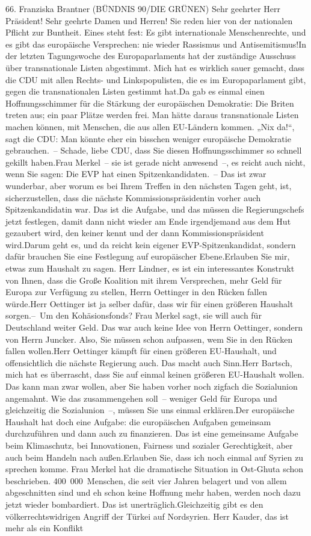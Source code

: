 \documentclass{article}
\begin{document}
	66. Franziska Brantner (BÜNDNIS 90/DIE GRÜNEN) Sehr geehrter Herr Präsident! Sehr geehrte Damen und Herren! Sie reden hier von der nationalen Pflicht zur Buntheit. Eines steht fest: Es gibt internationale Menschenrechte, und es gibt das europäische Versprechen: nie wieder Rassismus und Antisemitismus!In der letzten Tagungswoche des Europaparlaments hat der zuständige Ausschuss über transnationale Listen abgestimmt. Mich hat es wirklich sauer gemacht, dass die CDU mit allen Rechts- und Linkspopulisten, die es im Europaparlament gibt, gegen die transnationalen Listen gestimmt hat.Da gab es einmal einen Hoffnungsschimmer für die Stärkung der europäischen Demokratie: Die Briten treten aus; ein paar Plätze werden frei. Man hätte daraus transnationale Listen machen können, mit Menschen, die aus allen EU-Ländern kommen. „Nix da!“, sagt die CDU: Man könnte eher ein bisschen weniger europäische Demokratie gebrauchen. – Schade, liebe CDU, dass Sie diesen Hoffnungsschimmer so schnell gekillt haben.Frau Merkel – sie ist gerade nicht anwesend –, es reicht auch nicht, wenn Sie sagen: Die EVP hat einen Spitzenkandidaten. – Das ist zwar wunderbar, aber worum es bei Ihrem Treffen in den nächsten Tagen geht, ist, sicherzustellen, dass die nächste Kommissionspräsidentin vorher auch Spitzenkandidatin war. Das ist die Aufgabe, und das müssen die Regierungschefs jetzt festlegen, damit dann nicht wieder am Ende irgendjemand aus dem Hut gezaubert wird, den keiner kennt und der dann Kommissionspräsident wird.Darum geht es, und da reicht kein eigener EVP-Spitzenkandidat, sondern dafür brauchen Sie eine Festlegung auf europäischer Ebene.Erlauben Sie mir, etwas zum Haushalt zu sagen. Herr Lindner, es ist ein interessantes Konstrukt von Ihnen, dass die Große Koalition mit ihrem Versprechen, mehr Geld für Europa zur Verfügung zu stellen, Herrn ­Oettinger in den Rücken fallen würde.Herr Oettinger ist ja selber dafür, dass wir für einen größeren Haushalt sorgen.– Um den Kohäsionsfonds? Frau Merkel sagt, sie will auch für Deutschland weiter Geld. Das war auch keine Idee von Herrn Oettinger, sondern von Herrn Juncker. Also, Sie müssen schon aufpassen, wem Sie in den Rücken fallen wollen.Herr Oettinger kämpft für einen größeren EU-Haushalt, und offensichtlich die nächste Regierung auch. Das macht auch Sinn.Herr Bartsch, mich hat es überrascht, dass Sie auf einmal keinen größeren EU-Haushalt wollen. Das kann man zwar wollen, aber Sie haben vorher noch zigfach die Sozialunion angemahnt. Wie das zusammengehen soll – weniger Geld für Europa und gleichzeitig die Sozialunion –, müssen Sie uns einmal erklären.Der europäische Haushalt hat doch eine Aufgabe: die europäischen Aufgaben gemeinsam durchzuführen und dann auch zu finanzieren. Das ist eine gemeinsame Aufgabe beim Klimaschutz, bei Innovationen, Fairness und sozialer Gerechtigkeit, aber auch beim Handeln nach außen.Erlauben Sie, dass ich noch einmal auf Syrien zu sprechen komme. Frau Merkel hat die dramatische Situation in Ost-Ghuta schon beschrieben. 400 000 Menschen, die seit vier Jahren belagert und von allem abgeschnitten sind und eh schon keine Hoffnung mehr haben, werden noch dazu jetzt wieder bombardiert. Das ist unerträglich.Gleichzeitig gibt es den völkerrechtswidrigen Angriff der Türkei auf Nordsyrien. Herr Kauder, das ist mehr als ein Konflikt 
\end{document}

